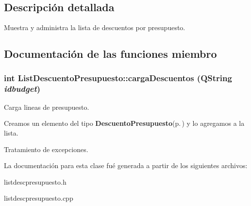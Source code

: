 \subsection{Descripci\'{o}n detallada}
Muestra y administra la lista de descuentos por presupuesto. 



\subsection{Documentaci\'{o}n de las funciones miembro}
\subsubsection{\setlength{\rightskip}{0pt plus 5cm}int List\-Descuento\-Presupuesto::carga\-Descuentos (QString {\em idbudget})}\label{classListDescuentoPresupuesto_a2}


Carga lineas de presupuesto. 

Creamos un elemento del tipo {\bf Descuento\-Presupuesto}{\rm (p.\,\pageref{classDescuentoPresupuesto})} y lo agregamos a la lista.

Tratamiento de excepciones. 

La documentaci\'{o}n para esta clase fu\'{e} generada a partir de los siguientes archivos:\begin{CompactItemize}
\item 
listdescpresupuesto.h\item 
listdescpresupuesto.cpp\end{CompactItemize}
